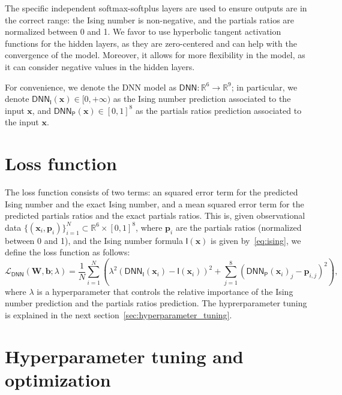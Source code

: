 \documentclass{psu-report}
\begin{document}
The specific independent softmax-softplus layers are used to ensure outputs
are in the correct range: the Ising number is non-negative, and the partials
ratios are normalized between 0 and 1.
We favor to use hyperbolic tangent activation functions for the hidden layers,
as they are zero-centered and can help with the convergence of the model.
Moreover, it allows for more flexibility in the model, as it can consider
negative values in the hidden layers.

For convenience, we denote the DNN model as \(\mathsf{DNN}: \mathbb{R}^6 \to
\mathbb{R}^9\); in particular, we denote
\(\mathsf{DNN}_\mathsf{I}(\mathbf{x})\in [0, +\infty)\)
as the Ising number prediction associated to the input \(\mathbf{x}\), and
\(\mathsf{DNN}_\mathsf{P}(\mathbf{x}) \in [0, 1]^8\)
as the partials ratios prediction associated to the input \(\mathbf{x}\).



\section{Loss function}

The loss function consists of two terms: an squared error term for the
predicted Ising number and the exact Ising number, and a mean squared error term
for the predicted partials ratios and the exact partials ratios.
This is, given observational data \(\{ (\mathbf{x}_i, \mathbf{p}_i)\}_{i=1}^N
\subset \mathbb{R}^6 \times [0,1]^8\), where \(\mathbf{p}_i\) are the
partials ratios (normalized between 0 and 1), and the Ising number formula
\(\mathsf{I}(\mathbf{x})\) is given by~\eqref{eq:ising}, we define the loss
function as follows:
\begin{equation}
    \label{eq:dnn_loss}
    \mathscr{L}_\mathsf{DNN}(\mathbf{W}, \mathbf{b}; \lambda) =
    \frac{1}{N} \sum_{i=1}^N \left(
        \lambda^2 \left( \mathsf{DNN}_\mathsf{I}(\mathbf{x}_i) - \mathsf{I}(\mathbf{x}_i) \right)^2
        +
        \sum_{j=1}^8 \left( \mathsf{DNN}_\mathsf{P}(\mathbf{x}_i)_j - \mathbf{p}_{i,j} \right)^2
    \right),
\end{equation}
where \(\lambda\) is a hyperparameter that controls the relative importance of
the Ising number prediction and the partials ratios prediction.
The hyprerparameter tuning is explained in the next section~\autoref{sec:hyperparameter_tuning}.

\section{Hyperparameter tuning and optimization}
\label{sec:hyperparameter_tuning}
\end{document}
